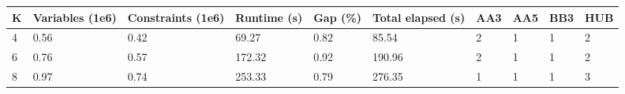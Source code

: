 \begin{tabular}{llllllllll}
\toprule
K & Variables (1e6) & Constraints (1e6) & Runtime (s) & Gap (\%) & Total elapsed (s) & AA3 & AA5 & BB3 & HUB \\
\midrule
4 & 0.56 & 0.42 & 69.27 & 0.82 & 85.54 & 2 & 1 & 1 & 2 \\
6 & 0.76 & 0.57 & 172.32 & 0.92 & 190.96 & 2 & 1 & 1 & 2 \\
8 & 0.97 & 0.74 & 253.33 & 0.79 & 276.35 & 1 & 1 & 1 & 3 \\
\bottomrule
\end{tabular}
